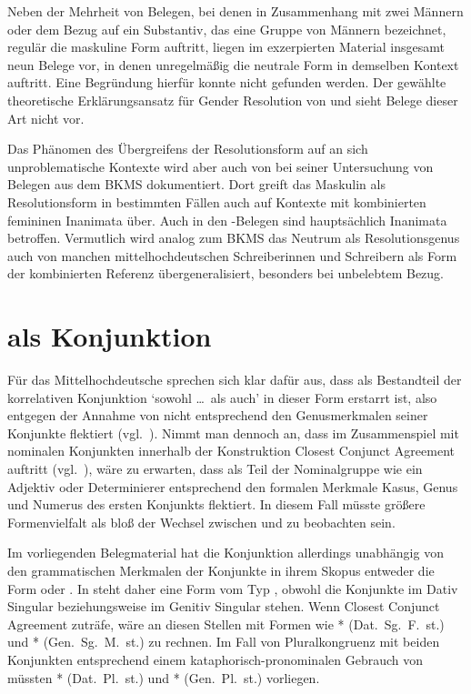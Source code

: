 Neben der Mehrheit von Belegen, bei denen in Zusammenhang mit zwei Männern oder
dem Bezug auf ein Substantiv, das eine Gruppe von Männern bezeichnet, regulär
die maskuline Form  auftritt, liegen im exzerpierten Material
insgesamt neun Belege vor, in denen unregelmäßig die neutrale Form
 in demselben Kontext auftritt. Eine Begründung hierfür konnte
nicht gefunden werden. Der gewählte theoretische Erklärungsansatz für Gender
Resolution von \citet{wechslerzlatic2003} und \citet{wechsler2009} sieht Belege
dieser Art nicht vor.

Das Phänomen des Übergreifens der Resolutionsform auf an sich unproblematische
Kontexte wird aber auch von \citet[302]{corbett1991} bei seiner Untersuchung
von Belegen aus dem BKMS dokumentiert. Dort greift das Maskulin als
Resolutionsform in bestimmten Fällen auch auf Kon\-texte mit kombinierten
femininen Inanimata über. Auch in den \CAO{}-Belegen sind hauptsächlich
Inanimata betroffen. Vermutlich wird analog zum BKMS das Neutrum als
Resolutionsgenus auch von manchen mittelhochdeutschen Schreiberinnen und
Schreibern als Form der kombinierten Referenz übergeneralisiert, besonders bei
unbelebtem Bezug.


\section{ als Konjunktion}
\label{sec:beideconj}

Für das Mittelhochdeutsche sprechen sich \citet[626--627]{ksw2} klar dafür aus,
dass  als Bestandteil der korrelativen Konjunktion  `sowohl \dots\ als auch' in dieser Form erstarrt ist, also
 entgegen der Annahme von \citet{askedal1974} nicht entsprechend
den Genusmerkmalen seiner Konjunkte flektiert (vgl.~).
Nimmt man dennoch an, dass im Zusammenspiel mit nominalen Konjunkten innerhalb
der Konstruktion Closest Conjunct Agreement auftritt (vgl.~),
wäre zu erwarten, dass  als Teil der Nominalgruppe wie ein Adjektiv
oder Determinierer entsprechend den formalen Merkmale Kasus, Genus und Numerus
des ersten Konjunkts flektiert. In diesem Fall müsste größere Formenvielfalt
als bloß der Wechsel zwischen  und  zu beobachten
sein.

Im vorliegenden Belegmaterial hat die Konjunktion allerdings unabhängig von den
grammatischen Merkmalen der Konjunkte in ihrem Skopus entweder die Form
 oder . In  steht daher eine
Form vom Typ , obwohl die Konjunkte im Dativ Singular
 beziehungsweise im Genitiv Singular
 stehen. Wenn Closest Conjunct Agreement zuträfe, wäre
an diesen Stellen mit Formen wie * (Dat.~Sg.~F.~st.) und
* (Gen.~Sg.~M.~st.) zu rechnen. Im Fall von Pluralkongruenz mit
beiden Konjunkten entsprechend einem kataphorisch-pronominalen Gebrauch von
 müssten * (Dat.\ Pl.\ st.) und *
(Gen.\ Pl.\ st.) vorliegen.

